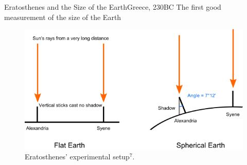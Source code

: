 \documentclass[12pt]{beamer}
\begin{document}
        \begin{frame}{Eratosthenes and the Size of the Earth}{Greece, 230BC} \centering
            The first good measurement of the size of the Earth
            \pause
            \begin{figure}
                \includegraphics[scale=0.35, frame]{eritosthenesdiagram.png}
                \caption{Eratosthenes' experimental setup$^7$.}
            \end{figure}
        \end{frame}
\end{document}
